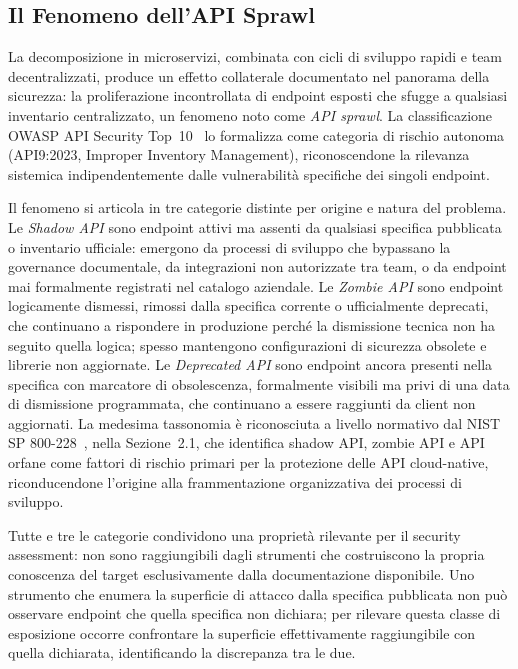 \subsection{Il Fenomeno dell'API Sprawl}\label{subsec:api-sprawl}

La decomposizione in microservizi, combinata con cicli di sviluppo rapidi e team decentralizzati, produce un effetto collaterale documentato nel panorama della sicurezza: la proliferazione incontrollata di endpoint esposti che sfugge a qualsiasi inventario centralizzato, un fenomeno noto come \emph{API sprawl}. La classificazione \gls{OWASP} API Security Top~10~\cite{OWASPTop10} lo formalizza come categoria di rischio autonoma (API9:2023, Improper Inventory Management), riconoscendone la rilevanza sistemica indipendentemente dalle vulnerabilità specifiche dei singoli endpoint.

Il fenomeno si articola in tre categorie distinte per origine e natura del problema. Le \emph{Shadow API} sono endpoint attivi ma assenti da qualsiasi specifica pubblicata o inventario ufficiale: emergono da processi di sviluppo che bypassano la governance documentale, da integrazioni non autorizzate tra team, o da endpoint mai formalmente registrati nel catalogo aziendale. Le \emph{Zombie API} sono endpoint logicamente dismessi, rimossi dalla specifica corrente o ufficialmente deprecati, che continuano a rispondere in produzione perché la dismissione tecnica non ha seguito quella logica; spesso mantengono configurazioni di sicurezza obsolete e librerie non aggiornate. Le \emph{Deprecated API} sono endpoint ancora presenti nella specifica con marcatore di obsolescenza, formalmente visibili ma privi di una data di dismissione programmata, che continuano a essere raggiunti da client non aggiornati.
La medesima tassonomia è riconosciuta a livello normativo dal NIST SP 800-228~\cite{chandramouliGuidelinesAPIProtection2026}, nella Sezione~2.1, che identifica shadow API, zombie API e API orfane come fattori di rischio primari per la protezione delle API cloud-native, riconducendone l'origine alla frammentazione organizzativa dei processi di sviluppo.

Tutte e tre le categorie condividono una proprietà rilevante per il security assessment: non sono raggiungibili dagli strumenti che costruiscono la propria conoscenza del target esclusivamente dalla documentazione disponibile. Uno strumento che enumera la superficie di attacco dalla specifica pubblicata non può osservare endpoint che quella specifica non dichiara; per rilevare questa classe di esposizione occorre confrontare la superficie effettivamente raggiungibile con quella dichiarata, identificando la discrepanza tra le due.




